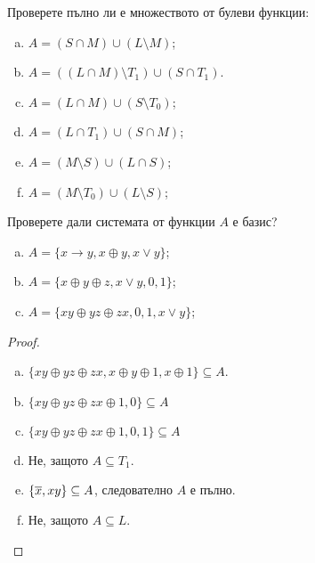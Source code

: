 \begin{problem} %
  Проверете пълно ли е множеството от булеви функции:
  \begin{enumerate}[a)]
  \item
    $A = (S\cap M)\cup(L\setminus M)$;
  \item
    $A = ((L\cap M)\setminus T_1)\cup (S\cap T_1)$.
  \item
    $A = (L\cap M)\cup (S\setminus T_0)$;
  \item
    $A = (L\cap T_1)\cup (S\cap M)$;
  \item
    $A = (M\setminus S)\cup(L\cap S)$;
  \item
    $A = (M\setminus T_0)\cup (L\setminus S)$;
  \end{enumerate}
\end{problem}

\begin{problem}
  Проверете дали системата от функции $A$ е базис?
  \begin{enumerate}[a)]
  \item
    $A = \{x\rightarrow y, x\oplus y, x\vee y\}$;
  \item
    $A = \{x\oplus y\oplus z, x\vee y, 0, 1\}$;
  \item
    $A = \{xy\oplus yz\oplus zx, 0, 1, x\vee y\}$;
  \end{enumerate}
\end{problem}
\begin{proof}
  \begin{enumerate}[a)]
  \item
    $\{xy\oplus yz\oplus zx, x\oplus y\oplus 1, x\oplus 1\} \subseteq A$.
  \item
    $\{xy\oplus yz\oplus zx\oplus 1, 0\} \subseteq A$
  \item
    $\{xy\oplus yz\oplus zx\oplus 1, 0, 1\} \subseteq A$
  \item
    Не, защото $A \subseteq T_1$.
  \item
    $\{\overline{x}, xy\} \subseteq A$, следователно $A$ е пълно.
  \item
    Не, защото $A\subseteq L$.
  \end{enumerate}
\end{proof}



